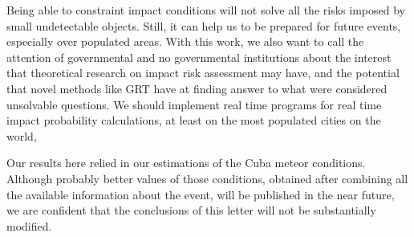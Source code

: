 \documentclass[fleqn,usenatbib]{mnras}
\begin{document}
Being able to constraint impact conditions will not solve all the risks imposed by small undetectable objects.  Still, it can help us to be prepared for future events, especially over populated areas.  With this work, we also want to call the attention of governmental and no governmental institutions about the interest that theoretical research on impact risk assessment may have, and the potential that novel methods like GRT have at finding answer to what were considered unsolvable questions.  We should implement real time programs for real time impact probability calculations, at least on the most populated cities on the world, 

Our results here relied in our estimations of the Cuba meteor conditions.  Although probably better values of those conditions, obtained after combining all the available information about the event, will be published in the near future, we are confident that the conclusions of this letter will not be substantially modified.
 




\end{document}
